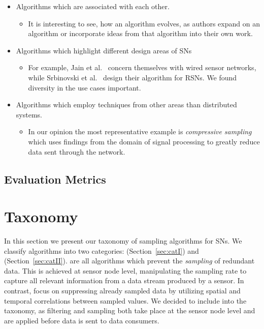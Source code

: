         \begin{itemize}
            \item Algorithms which are associated with each other.
            \begin{itemize}
                \item It is interesting to see, how an algorithm evolves, as
                authors expand on an algorithm or incorporate ideas from that
                algorithm into their own work.
            \end{itemize}
            \item Algorithms which highlight different design areas of \acp{SN}
            \begin{itemize}
                \item For example, Jain et al.~\cite{jain2004adaptive} concern
                themselves with wired sensor networks, while Srbinovski et
                al.~\cite{srbinovski2016energy} design their algorithm for
                \acp{RSN}. We found diversity in the use cases important.
            \end{itemize}
            \item Algorithms which employ techniques from other areas than
            distributed systems. 
            \begin{itemize}
                \item In our opinion the most representative example is
                \textit{compressive sampling} which uses findings from the
                domain of signal processing to greatly reduce data sent through
                the network.
            \end{itemize}
        \end{itemize}


\subsection{Evaluation Metrics}
\label{sec:Evaluation Metrics}

\section{Taxonomy}
\label{sec:Taxonomy}

In this section we present our taxonomy of sampling algorithms for \acp{SN}. We
classify algorithms into two categories: \catI (Section~\ref{sec:catI}) and
\catII (Section~\ref{sec:catII}). %
\catI are all algorithms which prevent the \textit{sampling} of redundant data.
This is achieved at sensor node level, manipulating the sampling rate to
capture all relevant information from a data stream produced by a sensor. In
contrast, \catII focus on suppressing already sampled data by utilizing spatial
and temporal correlations between sampled values. We decided to include \catII
into the taxonomy, as filtering and sampling both take place at the sensor node
level and are applied before data is sent to data consumers.

